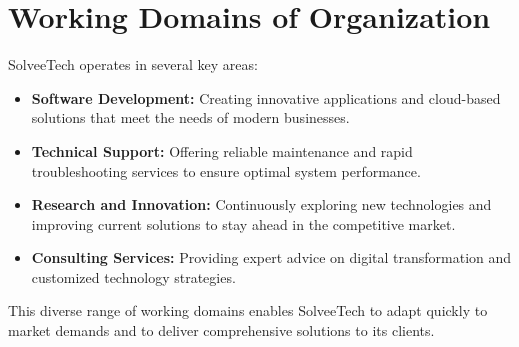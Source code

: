 \section{Working Domains of Organization}
SolveeTech operates in several key areas:
\begin{itemize}
  \item \textbf{Software Development:} Creating innovative applications and cloud-based solutions that meet the needs of modern businesses.
  \item \textbf{Technical Support:} Offering reliable maintenance and rapid troubleshooting services to ensure optimal system performance.
  \item \textbf{Research and Innovation:} Continuously exploring new technologies and improving current solutions to stay ahead in the competitive market.
  \item \textbf{Consulting Services:} Providing expert advice on digital transformation and customized technology strategies.
\end{itemize}
This diverse range of working domains enables SolveeTech to adapt quickly to market demands and to deliver comprehensive solutions to its clients.
